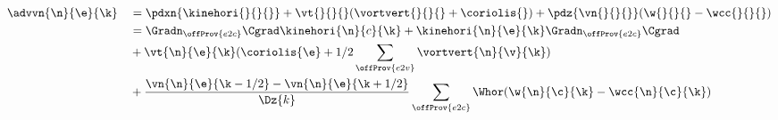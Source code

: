 $$
\begin{aligned}
    & \advvn{\n}{\e}{\k} &  & = \pdxn{\kinehori{}{}{}} + \vt{}{}{} (\vortvert{}{}{} + \coriolis{}) + \pdz{\vn{}{}{}} (\w{}{}{} - \wcc{}{}{}) \\
    &                    &  & = \Gradn_{\offProv{e2c}} \Cgrad \kinehori{\n}{c}{\k} + \kinehori{\n}{\e}{\k} \Gradn_{\offProv{e2c}} \Cgrad     \\
    &                    &  & + \vt{\n}{\e}{\k} (\coriolis{\e} + 1/2 \sum_{\offProv{e2v}} \vortvert{\n}{\v}{\k})                             \\
    &                    &  & + \frac{\vn{\n}{\e}{\k-1/2} - \vn{\n}{\e}{\k+1/2}}{\Dz{k}}
    \sum_{\offProv{e2c}} \Whor (\w{\n}{\c}{\k} - \wcc{\n}{\c}{\k})
\end{aligned}
$$
